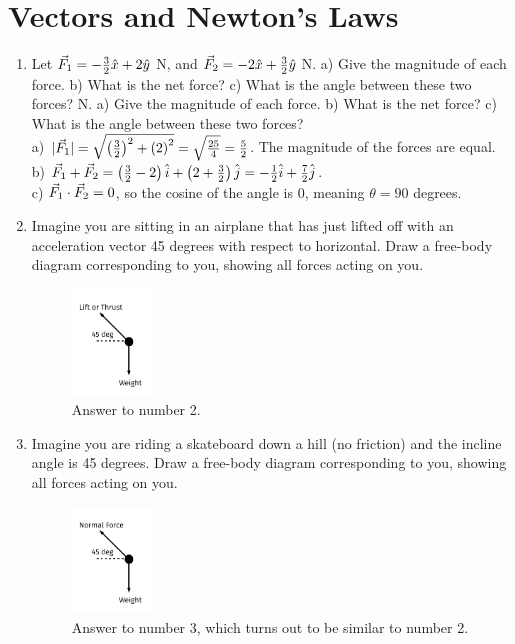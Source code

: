 \documentclass[10pt]{article}
\begin{document}
\maketitle

\section{Vectors and Newton's Laws}
\begin{enumerate}
\item Let $\vec{F}_{\rm 1} = -\frac{3}{2}\hat{x} + 2\hat{y}$ N, and $\vec{F}_{\rm 2} = -2\hat{x} + \frac{3}{2}\hat{y}$ N.  a) Give the magnitude of each force.  b) What is the net force?  c) What is the angle between these two forces? N.  a) Give the magnitude of each force.  b) What is the net force?  c) What is the angle between these two forces? \\
a) $|\vec{F}_{\rm 1}| = \sqrt{\left(\frac{3}{2}\right)^2+\left(2\right)^2} = \sqrt{\frac{25}{4}} = \frac{5}{2}$.  The magnitude of the forces are equal. \\
b) $\vec{F}_{\rm 1}+\vec{F}_{\rm 2} = \left(\frac{3}{2}-2\right)\hat{i} + \left(2+\frac{3}{2}\right)\hat{j} = -\frac{1}{2}\hat{i} + \frac{7}{2}\hat{j}$. \\
c) $\vec{F}_{\rm 1} \cdot \vec{F}_{\rm 2} = 0$, so the cosine of the angle is $0$, meaning $\theta = 90$ degrees.
\item Imagine you are sitting in an airplane that has just lifted off with an acceleration vector 45 degrees with respect to horizontal.  Draw a free-body diagram corresponding to you, showing all forces acting on you.
\begin{figure}[ht]
\centering
\includegraphics[width=0.2\textwidth]{figures/FBD1.pdf}
\caption{\label{fig:fbd1} Answer to number 2.}
\end{figure}
\item Imagine you are riding a skateboard down a hill (no friction) and the incline angle is 45 degrees.  Draw a free-body diagram corresponding to you, showing all forces acting on you.
\begin{figure}[ht]
\centering
\includegraphics[width=0.2\textwidth]{figures/FBD2.pdf}
\caption{\label{fig:fbd2} Answer to number 3, which turns out to be similar to number 2.}
\end{figure}
\end{enumerate}
\clearpage
\end{document}
